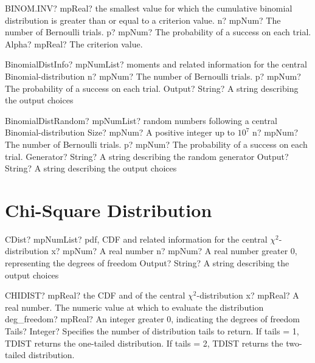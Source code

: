 \documentclass[12pt,a4paper,openany]{book}
\begin{document}
\begin{mpFunctionsExtract}
\mpWorksheetFunctionThreeNotImplemented
{BINOM.INV? mpReal? the smallest value for which the cumulative binomial distribution is greater than or equal to a criterion value.}
{n? mpNum? The number of Bernoulli trials.}
{p? mpNum? The probability of a success on each trial.}
{Alpha? mpReal? The criterion value.}
\end{mpFunctionsExtract}

\begin{mpFunctionsExtract}
\mpFunctionThreeNotImplemented
{BinomialDistInfo? mpNumList? moments and related information for the central Binomial-distribution}
{n? mpNum? The number of Bernoulli trials.}
{p? mpNum? The probability of a success on each trial.}
{Output? String? A string describing the output choices}
\end{mpFunctionsExtract}

\begin{mpFunctionsExtract}
\mpFunctionFiveNotImplemented
{BinomialDistRandom? mpNumList? random numbers following a central Binomial-distribution}
{Size? mpNum? A positive integer up to $10^7$}
{n? mpNum? The number of Bernoulli trials.}
{p? mpNum? The probability of a success on each trial.}
{Generator? String? A string describing the random generator}
{Output? String? A string describing the output choices}
\end{mpFunctionsExtract}

\section{Chi-Square Distribution}

\begin{mpFunctionsExtract}
\mpFunctionThreeNotImplemented
{CDist? mpNumList? pdf, CDF and related information for the central $\chi^2$-distribution}
{x? mpNum? A real number}
{n? mpNum? A real number greater 0, representing the degrees of freedom}
{Output? String? A string describing the output choices}
\end{mpFunctionsExtract}

\begin{mpFunctionsExtract}
\mpWorksheetFunctionThreeNotImplemented
{CHIDIST? mpReal? the CDF and of the central $\chi^2$-distribution}
{x? mpReal? A real number. The numeric value at which to evaluate the distribution}
{deg\_freedom? mpReal? An integer  greater 0, indicating the degrees of freedom}
{Tails? Integer? Specifies the number of distribution tails to return. If tails = 1, TDIST returns the one-tailed distribution. If tails = 2, TDIST returns the two-tailed distribution.}
\end{mpFunctionsExtract}
\end{document}

